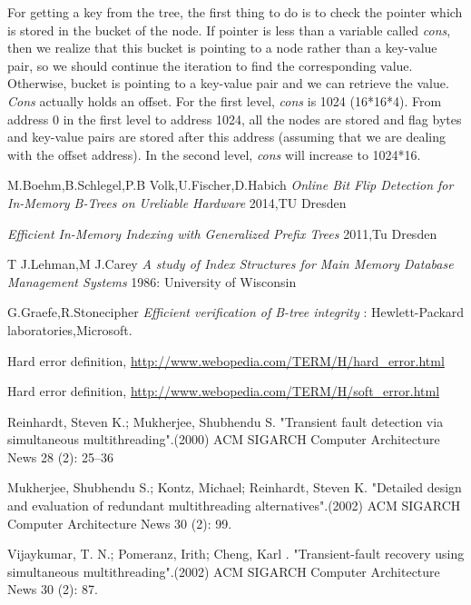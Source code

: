 \documentclass[12pt]{report}
\begin{document}
For getting a key from the tree, the first thing to do is to check the pointer which is stored in the bucket of the node. If pointer is less than a variable called \textit{cons}, then we realize that this bucket is pointing to a node rather than a key-value pair, so we should continue the iteration to find the corresponding value. Otherwise, bucket is pointing to a key-value pair and we can retrieve the value. \textit{Cons} actually holds an offset. For the first level, \textit{cons} is 1024 (16*16*4). From address 0 in the first level to address 1024, all the nodes are stored and flag bytes and key-value pairs are stored after this address (assuming that we are dealing with the offset address). In the second level, \textit{cons} will increase to 1024*16.

      

\begin{thebibliography}{1}

 M.Boehm,B.Schlegel,P.B Volk,U.Fischer,D.Habich {\em Online Bit Flip Detection for In-Memory B-Trees on Ureliable Hardware} 2014,TU Dresden 

  {\em Efficient In-Memory Indexing with Generalized Prefix Trees} 2011,Tu Dresden

 T J.Lehman,M J.Carey {\em A study of Index Structures for Main Memory Database Management Systems} 1986: University of Wisconsin

 G.Graefe,R.Stonecipher {\em Efficient verification of B-tree integrity} : Hewlett-Packard laboratories,Microsoft.

Hard error definition, \url{http://www.webopedia.com/TERM/H/hard_error.html}

Hard error definition, \url{http://www.webopedia.com/TERM/H/soft_error.html}

Reinhardt, Steven K.; Mukherjee, Shubhendu S. "Transient fault detection via simultaneous multithreading".(2000) ACM SIGARCH Computer Architecture News 28 (2): 25–36

 Mukherjee, Shubhendu S.; Kontz, Michael; Reinhardt, Steven K. "Detailed design and evaluation of redundant multithreading alternatives".(2002) ACM SIGARCH Computer Architecture News 30 (2): 99.

 Vijaykumar, T. N.; Pomeranz, Irith; Cheng, Karl . "Transient-fault recovery using simultaneous multithreading".(2002) ACM SIGARCH Computer Architecture News 30 (2): 87.


\end{thebibliography}
\end{document}

